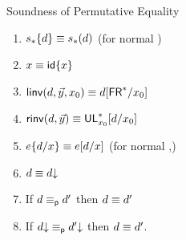 \begin{conjecture}{Soundness of Permutative Equality} \label{thm:permutative-soundess}
\begin{enumerate}
\item $s_*\{d\} \equiv s_*(d)$ (for normal \D)
\item $x \equiv {\ensuremath{\mathsf{id}}\{x\}}$
\item $\mathsf{linv}(d,\vec{y},x_0) \equiv d[\mathsf{FR}^*/x_0]$
\item $\mathsf{rinv}(d,\vec{y}) \equiv \mathsf{UL}^*_{x_0}[d/x_0]$
\item $e\{d/x\} \equiv e[d/x]$ (for normal \D,\E)
\item $d \equiv d\mathord{\downarrow}$
\item If $d \equiv_{\mathsf{p}} d'$ then $d \equiv d'$
\item If $d\mathord{\downarrow} \equiv_{\mathsf{p}} d'\mathord{\downarrow}$ then $d \equiv d'$.  
\end{enumerate}
\end{conjecture}
